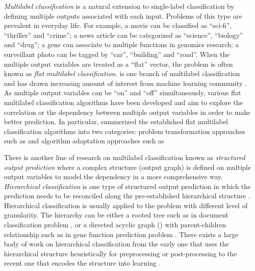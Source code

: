 \textit{Multilabel classification} is a natural extension to single-label classification by defining multiple outputs associated with each input.
Problems of this type are prevalent in everyday life.
For example, a movie can be classified as ``sci-fi'', ``thriller'' and ``crime''; a news article can be categorized as ``science'', ``biology'' and ``drug''; a gene can associate to multiple functions in genomics research; a surveillant photo can be tagged by ``car'', ``building'' and ``road''. 
When the multiple output variables are treated as a ``flat'' vector, the problem is often known as \textit{flat multilabel classification}.
 is one branch of multilabel classification and has drawn increasing amount of interest from machine learning community \citep{Tsoumakas07multi,Tsoumakas10mining}.
As multiple output variables can be ``on'' and ``off'' simultaneously, various flat multilabel classification algorithms have been developed and aim to explore the correlation or the dependency between multiple output variables in order to make better prediction.
In particular, \citet{Tsoumakas07multi} summerized the established flat multilabel classification algorithms into two categories: problem transformation approaches such as \citep{Zhang05a,Read09classifier,Cheng09combining} and algorithm adaptation approaches such as \citep{Schapire99improved,Bian12corrlog}


There is another line of research on multilabel classification known as \textit{structured output prediction} where a complex structure (output graph) is defined on multiple output variables to model the dependency in a more comprehensive way.
\textit{Hierarchical classification} is one type of structured output prediction in which the prediction needs to be reconciled along the pre-established hierarchical structure \citep{Silla11a}.
Hierarchical classification is usually applied to the problem with different level of granularity. 
The hierarchy can be either a rooted tree such as in document classification problem \citep{Hao07hierarchicaly,Li07hierarchical,Rousu06}, or a directed acyclic graph (\daggraph) with parent-children relationship such as in gene function prediction problem \citep{Barutcuoglu06hierarchical}.
There exists a large body of work on hierarchical classification from the early one that uses the hierarchical structure heuristically for preprocessing or post-processing \citep{Koller97hierarchically,Dumais00Hierarchical,Liu05support,DeCoro07bayesian} to the recent one that encodes the structure into learning \citep{Cai04hierarchical,Cesabianchi05incremental,Rousu06,Gopal12bayesian}.

